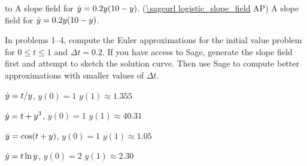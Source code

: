 \figure
\texonly
\hbox to 
\begincaption
A slope field for $\displaystyle\dot y=0.2y(10-y)$.
(\expandafter\url\expandafter{\sageurl logistic_slope_field}%
AP\endurl)
\endcaption
\endtexonly
{}
\begincaption
A slope field for $\displaystyle\dot y=0.2y(10-y)$.
\endcaption
\endfigure

\exercises

In problems 1--4, compute the Euler approximations for the initial
value problem for $0\le t\le 1$ and $\Delta t=0.2$. If you have access
to Sage, generate the slope field first and attempt to sketch the
solution curve. Then use Sage to compute better approximations with
smaller values of $\Delta t$.

\exercise $\displaystyle\dot y=t/y$, $y(0)=1$
\answer $y(1)\approx 1.355$
\endanswer
\endexercise

\exercise $\displaystyle\dot y=t+y^3$, $y(0)=1$
\answer $y(1)\approx 40.31$
\endanswer
\endexercise

\exercise $\displaystyle\dot y=\cos(t+y)$, $y(0)=1$
\answer $y(1)\approx 1.05$
\endanswer
\endexercise

\exercise $\displaystyle\dot y=t\ln y$, $y(0)=2$
\answer $y(1)\approx 2.30$
\endanswer
\endexercise

\endexercises
